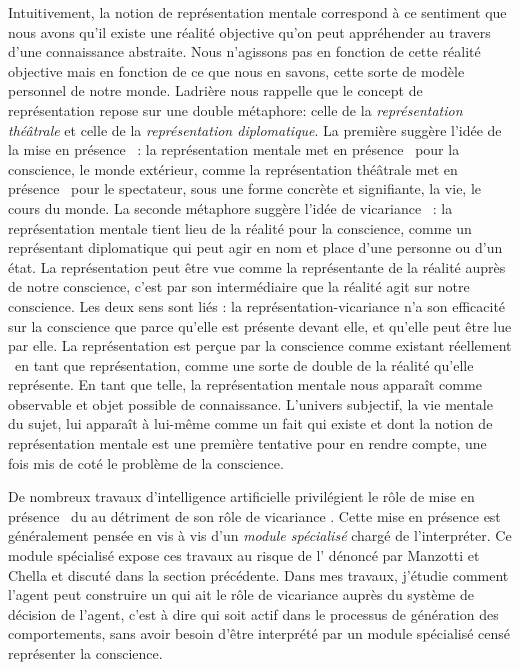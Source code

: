 Intuitivement, la notion de représentation mentale correspond à ce sentiment que nous avons qu’il existe une réalité objective qu’on peut appréhender au travers d’une connaissance abstraite. 
Nous n’agissons pas en fonction de cette réalité objective mais en fonction de ce que nous en savons, cette sorte de modèle personnel de notre monde. 
Ladrière \cite{ladriere_representation_nodate} nous rappelle que le concept de représentation repose sur une double métaphore: celle de la \emph{représentation théâtrale} et celle de la \emph{représentation diplomatique}. 
La première suggère l'idée de la \og mise en présence \fg\ : la représentation mentale \og met en présence \fg\ pour la conscience, le monde extérieur, comme la représentation théâtrale \og met en présence \fg\ pour le spectateur, sous une forme concrète et signifiante, la vie, le cours du monde. 
La seconde métaphore suggère l'idée de \og vicariance \fg\ : la représentation mentale tient lieu de la réalité pour la conscience, comme un représentant diplomatique qui peut agir en nom et place d’une personne ou d’un état. 
La représentation peut être vue comme la représentante de la réalité auprès de notre conscience, c'est par son intermédiaire que la réalité agit sur notre conscience.
Les deux sens sont liés : la représentation-vicariance n'a son efficacité sur la conscience que parce qu’elle est présente \og devant elle\fg, et qu’elle peut être lue par elle. 
La représentation est perçue par la conscience comme \og existant réellement \fg\ en tant que représentation, comme une sorte de double de la réalité qu’elle représente. 
En tant que telle, la représentation mentale nous apparaît comme observable et objet possible de connaissance. 
L’univers subjectif, la vie mentale du sujet, lui apparaît à lui-même comme un fait qui existe et dont la notion de représentation mentale est une première tentative pour en rendre compte, une fois mis de coté le problème de la conscience. 

De nombreux travaux d'intelligence artificielle privilégient le rôle de \og mise en présence  \fg\ du  au détriment de son rôle de \og vicariance \fg{}. 
Cette mise en présence est généralement pensée en vis à vis d'un \emph{module spécialisé} chargé de l'interpréter.
Ce module spécialisé expose ces travaux au risque de l' dénoncé par Manzotti et Chella  et discuté dans la section précédente. 
Dans mes travaux, j'étudie comment l'agent peut construire un  qui ait le rôle de vicariance auprès du système de décision de l'agent, c'est à dire qui soit actif dans le processus de génération des comportements, sans avoir besoin d'être interprété par un module spécialisé censé représenter la conscience. 



